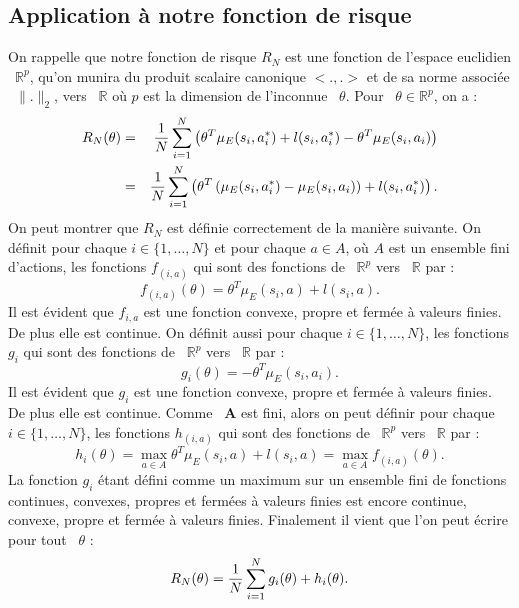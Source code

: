 \documentclass[publibook-draft]{CAp2012}
\newcommand{\A}{\mathbf{A}}
\begin{document}
\subsection{Application à notre fonction de risque}
On rappelle que notre fonction de risque $R_N$ est une fonction de l'espace euclidien ~$\mathbb{R}^p$, qu'on munira du produit scalaire canonique $<.,.>$ et de sa norme associée ~$\|.\|_2$, vers ~$\mathbb{R}$ où $p$ est la dimension de l'inconnue ~$\theta$. Pour ~$\theta\in\mathbb{R}^p$, on a :
\begin{eqnarray}
   R_N(\theta) &=& {1\over N} \sum_{i=1}^N\left(\theta ^T \mu_E(s_i,a^*_i) + l(s_i,a^*_i) - \theta ^T \mu_E(s_i,a_i) \right)\\
   &=& {1\over N} \sum_{i=1}^N\left(\theta^T\left(\mu_E(s_i,a^*_i) - \mu_E(s_i,a_i)\right) + l(s_i,a^*_i)  \right).
\end{eqnarray}
On peut montrer que $R_N$ est définie correctement de la manière suivante.
On définit pour chaque $i\in\{1,\dots,N\}$ et pour chaque $a\in A$, où $A$ est un ensemble fini d'actions, les fonctions $f_{(i,a)}$ qui sont des fonctions de ~$\mathbb{R}^p$ vers ~$\mathbb{R}$ par :
\begin{equation}
f_{(i,a)}({\theta})=\theta ^T \mu_E(s_i,a) + l(s_i,a).
\end{equation}
Il est évident que $f_{i,a}$ est une fonction convexe, propre et fermée à valeurs finies. De plus elle est continue. On définit aussi pour chaque $i\in\{1,\dots,N\}$, les fonctions $g_{i}$ qui sont des fonctions de ~$\mathbb{R}^p$ vers ~$\mathbb{R}$ par :
\begin{equation}
g_{i}({\theta})=-\theta ^T \mu_E(s_i,a_i).
\end{equation}
Il est évident que $g_{i}$ est une fonction convexe, propre et fermée à valeurs finies. De plus elle est continue.
Comme ~$\A$ est fini, alors on peut définir pour chaque $i\in\{1,\dots,N\}$, les fonctions $h_{(i,a)}$ qui sont des fonctions de ~$\mathbb{R}^p$ vers ~$\mathbb{R}$ par :
\begin{equation}
h_{i}({\theta})=\max_{a \in A}\theta ^T \mu_E(s_i,a) + l(s_i,a)=\max_{a \in A}f_{(i,a)}({\theta}).
\end{equation}
La fonction $g_{i}$ étant défini comme un maximum sur un ensemble fini de fonctions continues, convexes, propres et fermées à valeurs finies est encore continue, convexe, propre et fermée à valeurs finies.
Finalement il vient que l'on peut écrire pour tout ~$\theta$ :
\begin{equation}
R_N(\theta) = {1\over N} \sum_{i=1}^N g_{i}({\theta})+h_{i}({\theta}).
\end{equation}
\end{document}
